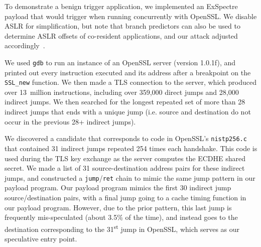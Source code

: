 To demonstrate a benign trigger application, we implemented an ExSpectre payload
that would trigger when running concurrently with OpenSSL.
We disable ASLR for simplification, but note that branch predictors can also be
used to determine ASLR offsets of co-resident applications, and our attack
adjusted accordingly~\cite{evtyushkin2016jump}.

We used \texttt{gdb} to run an instance of an OpenSSL server (version 1.0.1f),
and printed out every instruction executed and its address after a breakpoint on
the \texttt{SSL\_new} function. We then made a TLS connection to the server,
which produced over 13~million instructions, including over 359,000 direct jumps
and 28,000 indirect jumps. We then searched for the longest repeated set of more
than 28 indirect jumps that ends with a unique jump (i.e. source and destination
do not occur in the previous 28+ indirect jumps).

We discovered a candidate that corresponds to code in OpenSSL's
\texttt{nistp256.c} that contained 31 indirect jumps repeated 254 times each
handshake. This code is used during the TLS key exchange as the server computes
the ECDHE shared secret. We made a list of 31 source-destination address pairs
for these indirect jumps, and constructed a \texttt{jump}/\texttt{ret} chain to
mimic the same jump pattern in our payload program. Our payload program mimics
the first 30 indirect jump source/destination pairs, with a final jump going to
a cache timing function in our payload program. However, due to the prior
pattern, this last jump is frequently mis-speculated (about 3.5\% of the time),
and instead goes to the destination corresponding to the 31\textsuperscript{st} jump in OpenSSL,
which serves as our speculative entry point.


